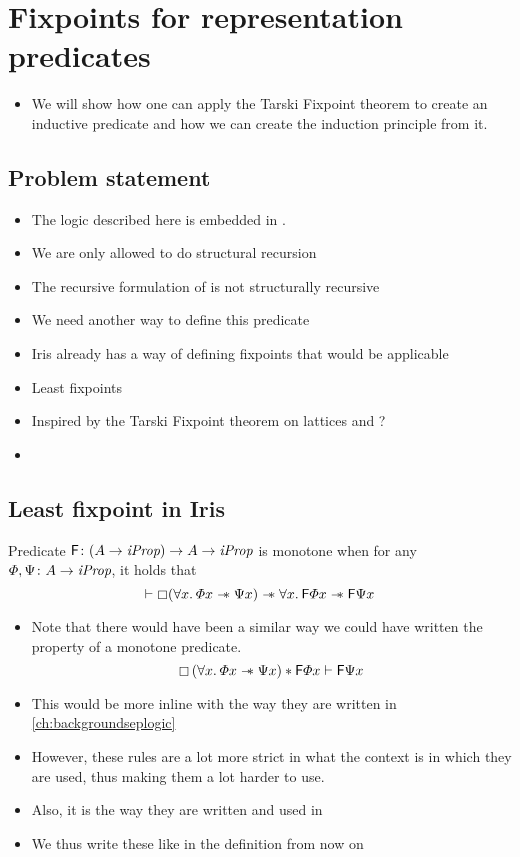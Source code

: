 \documentclass[thesis.tex]{subfiles}
\begin{document}
\chapter{Fixpoints for representation predicates}
\label{ch:fixpoints}
\begin{itemize}
    \item We will show how one can apply the Tarski Fixpoint theorem to create an inductive predicate and how we can create the induction principle from it.
\end{itemize}

\section{Problem statement}
\begin{itemize}
    \item The logic described here is embedded in \coq.
    \item We are only allowed to do structural recursion
    \item The recursive formulation of \isMLL is not structurally recursive
    \item We need another way to define this predicate
    \item Iris already has a way of defining fixpoints that would be applicable
    \item Least fixpoints
    \item Inspired by the Tarski Fixpoint theorem on lattices and ?
    \item
\end{itemize}

\section{Least fixpoint in Iris}
\begin{definition}
    Predicate $\textsf{\upshape F}\colon (A \to \textit{iProp}) \to  A \to \textit{iProp}$ is monotone when for any $\varPhi, \Psi\colon A \to \textit{iProp}$, it holds that
    \[\proves \always(\All \var. \pred\var \wand \predB\var) \wand \All \var. \hopred\pred\var \wand \hopred\predB\var\]
\end{definition}
\begin{itemize}
    \item Note that there would have been a similar way we could have written the property of a monotone predicate.
          \[
              \always{(\All \var. \pred\var \wand \predB\var)} * \hopred\pred\var \proves \hopred\predB\var
          \]
    \item This would be more inline with the way they are written in \cref*{ch:backgroundseplogic}
    \item However, these rules are a lot more strict in what the context is in which they are used, thus making them a lot harder to use.
    \item Also, it is the way they are written and used in \iris
    \item We thus write these like in the definition from now on
\end{itemize}
\end{document}
